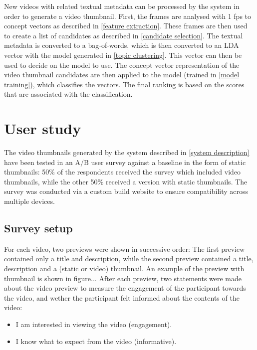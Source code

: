 \documentclass{../resources/acm_proc_article-sp}
\begin{document}
New videos with related textual metadata can be processed by the system in order to generate a video thumbnail. First, the frames are analysed with 1 fps to concept vectors as described in \ref{feature extraction}. These frames are then used to create a list of candidates as described in \ref{candidate selection}. The textual metadata is converted to a bag-of-words, which is then converted to an LDA vector with the model generated in \ref{topic clustering}. This vector can then be used to decide on the model to use. The concept vector representation of the video thumbnail candidates are then applied to the model (trained in \ref{model training}), which classifies the vectors. The final ranking is based on the scores that are associated with the classification.



\section{User study}
The video thumbnails generated by the system described in \ref{system description} have been tested in an A/B user survey against a baseline in the form of static thumbnails: 50\% of the respondents received the survey which included video thumbnails, while the other 50\% received a version with static thumbnails. The survey was conducted via a custom build website to ensure compatibility across multiple devices.

\subsection{Survey setup}

For each video, two previews were shown in successive order: The first preview contained only a title and description, while the second preview contained a title, description and a (static or video) thumbnail. An example of the preview with thumbnail is shown in figure... 
After each preview, two statements were made about the video preview to measure the engagement of the participant towards the video, and wether the participant felt informed about the contents of the video:

\begin{itemize}
	\item I am interested in viewing the video (engagement).
	\item I know what to expect from the video (informative).
\end{itemize}
\end{document}
